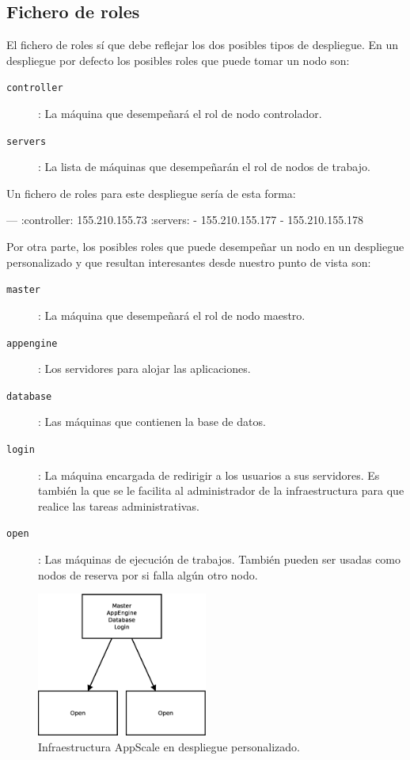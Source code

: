 \subsection{Fichero de roles}

El fichero de roles sí que debe reflejar los dos posibles tipos de despliegue. En un despliegue por defecto los posibles roles que puede tomar un nodo son:

\begin{description}
\item[\texttt{controller}]: La máquina que desempeñará el rol de nodo controlador.
\item[\texttt{servers}]: La lista de máquinas que desempeñarán el rol de nodos de trabajo.
\end{description}

Un fichero de roles para este despliegue sería de esta forma:

\begin{yamlcode}
--- 
:controller: 155.210.155.73
:servers: 
- 155.210.155.177
- 155.210.155.178
\end{yamlcode}

Por otra parte, los posibles roles que puede desempeñar un nodo en un despliegue personalizado y que resultan interesantes desde nuestro punto de vista son:

\begin{description}
\item[\texttt{master}]: La máquina que desempeñará el rol de nodo maestro.
\item[\texttt{appengine}]: Los servidores para alojar las aplicaciones.
\item[\texttt{database}]: Las máquinas que contienen la base de datos.
\item[\texttt{login}]: La máquina encargada de redirigir a los usuarios a sus servidores. Es también la que se le facilita al administrador de la infraestructura para que realice las tareas administrativas.
\item[\texttt{open}]: Las máquinas de ejecución de trabajos. También pueden ser usadas como nodos de reserva por si falla algún otro nodo.
\end{description}

\begin{figure} [!htbp]
  \centering
  \includegraphics[width=0.5\textwidth]{figuras/Arquitectura_AppScale.eps}
  \caption{Infraestructura AppScale en despliegue personalizado.}
\label{figure:arquitectura-appscale}
\end{figure}

